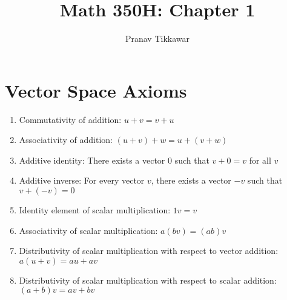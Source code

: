 \documentclass{article}
\author{Pranav Tikkawar}
\title{Math 350H: Chapter 1}
\begin{document}
\maketitle

\section{Vector Space Axioms}
\begin{enumerate}
    \item Commutativity of addition: $u+v = v+u$
    \item Associativity of addition: $(u+v)+w = u+(v+w)$
    \item Additive identity: There exists a vector $0$ such that $v+0 = v$ for all $v$
    \item Additive inverse: For every vector $v$, there exists a vector $-v$ such that $v+(-v) = 0$
    \item Identity element of scalar multiplication: $1v = v$
    \item Associativity of scalar multiplication: $a(bv) = (ab)v$
    \item Distributivity of scalar multiplication with respect to vector addition: $a(u+v) = au + av$
    \item Distributivity of scalar multiplication with respect to scalar addition: $(a+b)v = av + bv$
\end{enumerate}
\end{document}
